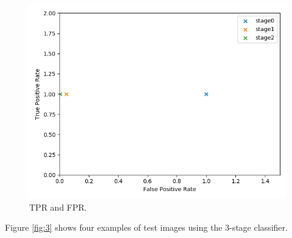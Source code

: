 \documentclass[12pt]{article}
\begin{document}
\begin{figure}[htb]
	\centering
	\includegraphics[width=\linewidth]{task2/result/plot.png}
	\caption{TPR and FPR.}
	\label{fig:2}
\end{figure}


Figure \ref{fig:3} shows four examples of test images using the 3-stage classifier. 
\end{document}
